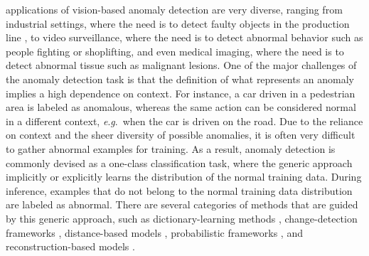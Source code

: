 \documentclass[10pt,journal,compsoc]{IEEEtran}
\newcommand{\eg}{\textit{e}.\textit{g}.}
\begin{document}
\IEEEdisplaynontitleabstractindextext

\IEEEpeerreviewmaketitle


 applications of vision-based anomaly detection are very diverse, ranging from industrial settings, where the need is to detect faulty objects in the production line \cite{Bergmann-CVPR-2019,Lee-A-2022}, to video surveillance, where the need is to detect abnormal behavior \cite{Luo-ICCV-2017} such as people fighting or shoplifting, and even medical imaging, where the need is to detect abnormal tissue \cite{Shvetsova-A-2021} such as malignant lesions. One of the major challenges of the anomaly detection task is that the definition of what represents an anomaly implies a high dependence on context. For instance, a car driven in a pedestrian area is labeled as anomalous, whereas the same action can be considered normal in a different context, \eg~when the car is driven on the road. Due to the reliance on context and the sheer diversity of possible anomalies, it is often very difficult to gather abnormal examples for training. As a result, anomaly detection is commonly devised as a one-class classification task, where the generic approach implicitly or explicitly learns the distribution of the normal training data. During inference, examples that do not belong to the normal training data distribution are labeled as abnormal. There are several categories of methods that are guided by this generic approach, such as dictionary-learning methods \cite{Carrera-TII-2017,Cheng-CVPR-2015,Cong-CVPR-2011, Dutta-AAAI-2015,Lu-ICCV-2013,Ren-BMVC-2015}, change-detection frameworks \cite{Giorno-ECCV-2016,Ionescu-ICCV-2017,Liu-BMVC-2018,Pang-CVPR-2020}, distance-based models \cite{Bergmann-CVPR-2020,Defard-ICPR-2021,Ionescu-CVPR-2019,Ionescu-WACV-2019,Ramachandra-WACV-2020a,Ramachandra-WACV-2020b,Ravanbakhsh-WACV-2018,Sabokrou-IP-2017,Sabokrou-CVIU-2018,Saligrama-CVPR-2012,Smeureanu-ICIAP-2017,Sun-PR-2017,Tran-BMVC-2017}, probabilistic frameworks \cite{Adam-PAMI-2008,Antic-ICCV-2011,Feng-NC-2017,Hinami-ICCV-2017,Kim-CVPR-2009,Mahadevan-CVPR-2010,Mehran-CVPR-2009,Rudolph-WACV-2021,Saleh-CVPR-2013,Wu-CVPR-2010}, and reconstruction-based models \cite{Fei-TMM-2020,Gong-ICCV-2019,Hasan-CVPR-2016,Li-BMVC-2020,Liu-CVPR-2018,Luo-ICCV-2017,Nguyen-ICCV-2019,Park-CVPR-2020,Ravanbakhsh-ICIP-2017,Salehi-CVPR-2021,Tang-PRL-2020,Venkataramanan-ECCV-2020}. 
\end{document}

